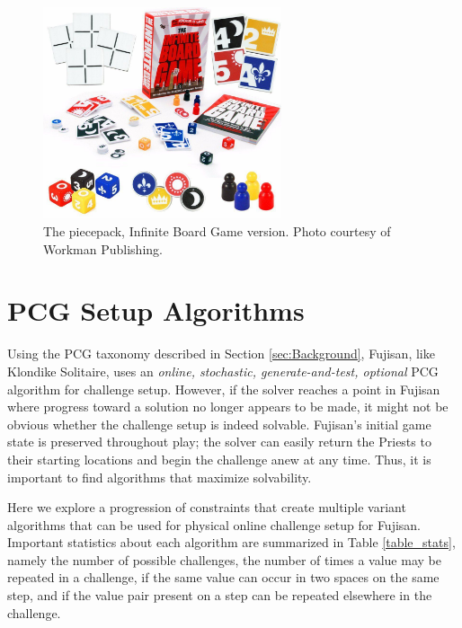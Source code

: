 \documentclass[10pt,journal,compsoc]{IEEEtran}
\begin{document}
\begin{figure}[t]
\centering
\includegraphics[width=7cm]{graphics/infinite2.jpg}
\caption{The piecepack, Infinite Board Game version. Photo courtesy of Workman
Publishing.}
\label{fig:piecepackinfinite}
\end{figure}

\section{PCG Setup Algorithms} \label{section:pcgalgs}

\noindent
Using the PCG taxonomy described in Section \ref{sec:Background}, Fujisan, like Klondike Solitaire, uses an {\it online, stochastic, generate-and-test, optional} PCG algorithm for challenge setup. However, if the solver reaches a point in Fujisan where progress toward a solution no longer appears to be made, it might not be obvious whether the challenge setup is indeed solvable. Fujisan's initial game state is preserved throughout play; the solver can easily return the Priests to their starting locations and begin the challenge anew at any time. Thus, it is important to find algorithms that maximize solvability.

Here we explore a progression of constraints that create multiple variant algorithms that can be used for physical online challenge setup for Fujisan. Important statistics about each algorithm are summarized in Table \ref{table_stats}, namely the number of possible challenges, the number of times a value may be repeated in a challenge, if the same value can occur in two spaces on the same step, and if the value pair present on a step can be repeated elsewhere in the challenge.
\end{document}
